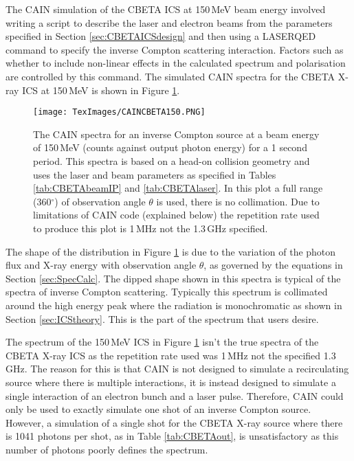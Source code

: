 \documentclass[11pt]{article}
\begin{document}
The CAIN simulation of the CBETA ICS at 150\,MeV beam energy involved writing a script to describe the laser and electron beams from the parameters specified in Section \ref{sec:CBETAICSdesign} and then using a LASERQED command \cite{CAINman} to specify the inverse Compton scattering interaction. Factors such as whether to include non-linear effects in the calculated spectrum and polarisation are controlled by this command. The simulated CAIN spectra for the CBETA X-ray ICS at 150\,MeV is shown in Figure \ref{fig:CAINCBETA}.

\begin{figure}[H]
\centering
\texttt{[image: TexImages/CAINCBETA150.PNG]}
\caption{\label{fig:CAINCBETA} The CAIN spectra for an inverse Compton source at a beam energy of 150\,MeV (counts against output photon energy) for a 1 second period. This spectra is based on a head-on collision geometry and uses the laser and beam parameters as specified in Tables \ref{tab:CBETAbeamIP} and \ref{tab:CBETAlaser}. In this plot a full range (360$^{\circ}$) of observation angle $\theta$ is used, there is no collimation. Due to limitations of CAIN code (explained below) the repetition rate used to produce this plot is 1\,MHz not the 1.3\,GHz specified.}
\end{figure}

The shape of the distribution in Figure \ref{fig:CAINCBETA} is due to the variation of the photon flux and X-ray energy with observation angle $\theta$, as governed by the equations in Section \ref{sec:SpecCalc}. The dipped shape shown in this spectra is typical of the spectra of inverse Compton scattering. Typically this spectrum is collimated around the high energy peak where the radiation is monochromatic as shown in Section \ref{sec:ICStheory}. This is the part of the spectrum that users desire.

The spectrum of the 150\,MeV ICS in Figure \ref{fig:CAINCBETA} isn't the true spectra of the CBETA X-ray ICS as the repetition rate used was 1\,MHz not the specified 1.3\,GHz. The reason for this is that CAIN is not designed to simulate a recirculating source where there is multiple interactions, it is instead designed to simulate a single interaction of an electron bunch and a laser pulse. Therefore, CAIN could only be used to exactly simulate one shot of an inverse Compton source. However, a simulation of a single shot for the CBETA X-ray source where there is 1041 photons per shot, as in Table \ref{tab:CBETAout}, is unsatisfactory as this number of photons poorly defines the spectrum.
\end{document}

